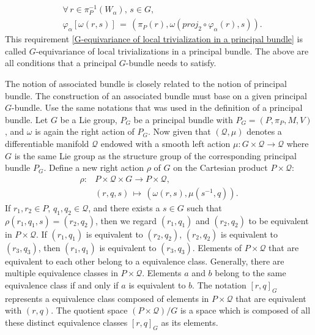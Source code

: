 \begin{equation}\label{G-equivariance of local trivialization in a principal bundle}
    \begin{split}
        &\forall\,r\in\pi_{P}^{-1}\left(W_{\alpha}\right),\,s\in G, \\
        &\varphi_{\alpha}[\omega\left(r,s\right)]\,=\,\left(\pi_{P}\left(r\right),\omega\left(proj_{2}\circ\varphi_{\alpha}\left(r\right),s\right)\right).
    \end{split}
\end{equation}
This requirement \eqref{G-equivariance of local trivialization in a principal bundle} is called $G$-equivariance of local trivializations in a principal bundle. The above are all conditions that a principal $G$-bundle needs to satisfy.  
\par The notion of associated bundle is closely related to the notion of principal bundle. The construction of an associated bundle must base on a given principal $G$-bundle. Use the same notations that was used in the definition of a principal bundle. Let $G$ be a Lie group, $P_{G}$ be a principal bundle with $P_{G}=\left(P,\pi_{P},M,V\right)$, and $\omega$ is again the right action of $P_{G}$. Now given that $\left(\mathcal{Q},\mu\right)$ denotes a differentiable manifold $\mathcal{Q}$ endowed with a smooth left action $\mu:G\times\mathcal{Q}\rightarrow\mathcal{Q}$ where $G$ is the same Lie group as the structure group of the corresponding principal bundle $P_{G}$. Define a new right action $\rho$ of $G$ on the Cartesian product $P\times\mathcal{Q}$:
\begin{equation}\label{right action on product space}
    \begin{split}
        \rho: &P\times\mathcal{Q}\times G\longrightarrow P\times\mathcal{Q}, \\
        &\left(r,q,s\right)\,\mapsto\,\left(\omega\left(r,s\right),\mu\left(s^{-1},q\right)\right).
    \end{split}
\end{equation}
If $r_{1},r_{2}\in P$, $q_{1},q_{2}\in\mathcal{Q}$, and there exists a $s\in G$ such that $\rho\left(r_{1},q_{1},s\right)=\left(r_{2},q_{2}\right)$, then we regard $\left(r_{1},q_{1}\right)$ and $\left(r_{2},q_{2}\right)$ to be equivalent in $P\times\mathcal{Q}$. If $\left(r_{1},q_{1}\right)$ is equivalent to $\left(r_{2},q_{2}\right)$, $\left(r_{2},q_{2}\right)$ is equivalent to $\left(r_{3},q_{3}\right)$, then $\left(r_{1},q_{1}\right)$ is equivalent to $\left(r_{3},q_{3}\right)$. Elements of $P\times\mathcal{Q}$ that are equivalent to each other belong to a equivalence class. Generally, there are multiple equivalence classes in $P\times\mathcal{Q}$. Elements $a$ and $b$ belong to the same equivalence class if and only if $a$ is equivalent to $b$. The notation $[r,q]_{G}$ represents a equivalence class composed of elements in $P\times\mathcal{Q}$ that are equivalent with $\left(r,q\right)$. The quotient space $\left(P\times\mathcal{Q}\right)/G$ is a space which is composed of all these distinct equivalence classes $[r,q]_{G}$ as its elements. 
